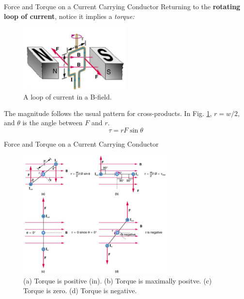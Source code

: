 \documentclass{beamer}
\begin{document}
\begin{frame}{Force and Torque on a Current Carrying Conductor}
\small
Returning to the \textbf{rotating loop of current}, notice it implies a \textit{torque:}
\begin{figure}
\centering
\includegraphics[width=0.5\textwidth]{figures/loop.png}
\caption{\label{fig:loop2} A loop of current in a B-field.}
\end{figure}
The magnitude follows the usual pattern for cross-products.  In Fig. \ref{fig:loop2}, $r = w/2$, and $\theta$ is the angle between $F$ and $r$.
\begin{equation}
\tau = rF\sin\theta
\end{equation}
\end{frame}

\begin{frame}{Force and Torque on a Current Carrying Conductor}
\begin{figure}
\centering
\includegraphics[width=0.7\textwidth]{figures/torque.png}
\caption{\label{fig:loop3} (a) Torque is positive (in). (b) Torque is maximally positve. (c) Torque is zero. (d) Torque is negative.}
\end{figure}
\end{frame}
\end{document}

